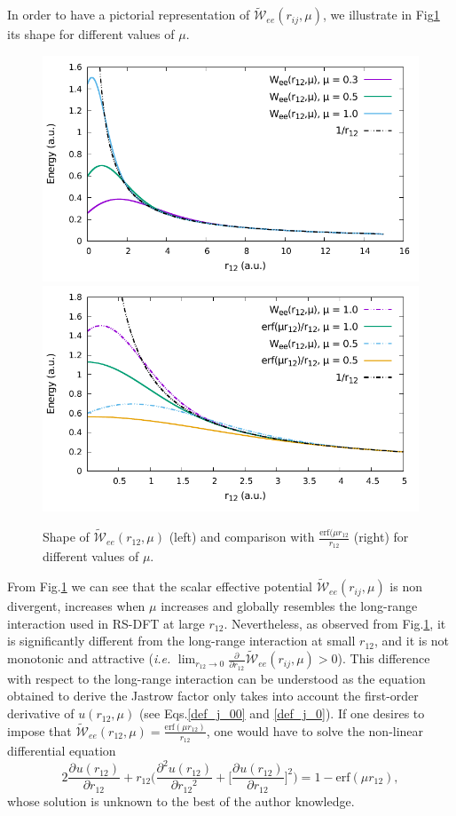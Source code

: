 \documentclass[aip,jcp,reprint,noshowkeys,superscriptaddress]{revtex4-1}
\newcommand{\deriv}[3]{\frac{\partial^{#3} #1}{\partial {#2}^{#3}}}
\begin{document}
In order to have a pictorial representation of $ \tilde{\mathcal{W}}_{ee}(r_{ij},\mu)$, we illustrate in Fig\ref{fig_wee_mu} its shape for different values of $\mu$. 
\begin{figure}
 \label{fig_wee_mu}
        \includegraphics[width=0.45\linewidth]{plots/jastrow/w_ee_small.pdf}
        \includegraphics[width=0.45\linewidth]{plots/jastrow/w_ee_erf.pdf}\\
        \caption{Shape of $\tilde{\mathcal{W}}_{ee}(r_{12},\mu)$ (left) and comparison with $\frac{\text{erf}(\mu r_{12}}{r_{12}}$ (right) for different values of $\mu$.}
\end{figure}
From  Fig.\ref{fig_wee_mu} we can see that the scalar effective potential $ \tilde{\mathcal{W}}_{ee}(r_{ij},\mu)$ 
is non divergent, increases when $\mu$ increases and globally resembles the long-range interaction used in RS-DFT at large $r_{12}$. 
Nevertheless, as observed from Fig.\ref{fig_wee_mu}, it is significantly different 
from the long-range interaction at small $r_{12}$, 
and it is not monotonic and attractive (\textit{i.e.} $\lim_{r_{12} \rightarrow 0} \deriv{}{r_{12}}{} \tilde{\mathcal{W}}_{ee}(r_{ij},\mu) >0 $). 
This difference with respect to the long-range interaction can be understood as the equation obtained to derive the Jastrow factor only takes into account the first-order derivative of $u(r_{12},\mu)$ (see Eqs.\eqref{def_j_00} and \eqref{def_j_0}). 
If one desires to impose that $\tilde{\mathcal{W}}_{ee}(r_{12},\mu) = \frac{\text{erf}(\mu r_{12})}{r_{12}}$, one would have to solve the non-linear differential equation 
\begin{equation}
 2 \deriv{u(r_{12})}{r_{12}}{} + r_{12} \bigg( \deriv{u(r_{12})}{r_{12}}{2} + \bigg[ \deriv{u(r_{12})}{r_{12}}{} \bigg]^2\bigg) = 1 - \text{erf}(\mu r_{12}), 
\end{equation}
whose solution is unknown to the best of the author knowledge. 
\end{document}
